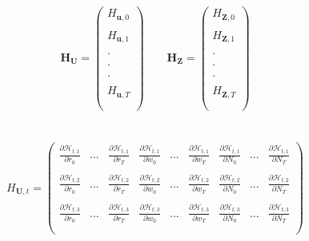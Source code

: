 \documentclass[titlepage]{\econtex}\providecommand{\texname}{BufferStockTheory}
\begin{document}
 $$  \mathbf{H}_{\mathbf{U}}= \begin{pmatrix} 
H_{\mathbf{u}, 0} \\ \\ 
H_{\mathbf{u}, 1}  \\ \\
. \\ \\
. \\ \\
. \\ \\ 
H_{\mathbf{u}, T} \\ \\
 \end{pmatrix} \quad \quad \mathbf{H}_{\mathbf{Z}}= \begin{pmatrix} 
H_{\mathbf{Z}, 0} \\ \\ 
H_{\mathbf{Z}, 1}  \\ \\
. \\ \\
. \\ \\
. \\ \\ 
H_{\mathbf{Z}, T} \\ \\
 \end{pmatrix}$$ \\ \\
 
 
 
$$ H_{\mathbf{U}, t}= \begin{pmatrix} 
\frac{ \partial \mathcal{H}_{t,1}}{\partial r_{0}}  & ... & \frac{ \partial \mathcal{H}_{t,1}}{\partial r_{T}} & \frac{ \partial \mathcal{H}_{t,1}}{\partial w_{0}} & ... & \frac{ \partial \mathcal{H}_{t,1}}{\partial w_{T}} & \frac{ \partial \mathcal{H}_{t,1}}{\partial N_{0}} & ... &\frac{ \partial \mathcal{H}_{t,1}}{\partial N_{T}} \\ \\ 
\frac{ \partial \mathcal{H}_{t,2}}{\partial r_{0}}  & ... & \frac{ \partial \mathcal{H}_{t,2}}{\partial r_{T}} & \frac{ \partial \mathcal{H}_{t,2}}{\partial w_{0}} & ... & \frac{ \partial \mathcal{H}_{t,2}}{\partial w_{T}} & \frac{ \partial \mathcal{H}_{t,2}}{\partial N_{0}} & ... &\frac{ \partial \mathcal{H}_{t,2}}{\partial N_{T}}  \\ \\
\frac{ \partial \mathcal{H}_{t,3}}{\partial r_{0}}  & ... & \frac{ \partial \mathcal{H}_{t,3}}{\partial r_{T}} & \frac{ \partial \mathcal{H}_{t,3}}{\partial w_{0}} & ... & \frac{ \partial \mathcal{H}_{t,3}}{\partial w_{T}} & \frac{ \partial \mathcal{H}_{t,3}}{\partial N_{0}} & ... &\frac{ \partial \mathcal{H}_{t,3}}{\partial N_{T}} \\ \\
 \end{pmatrix} $$ \\
 
\end{document}
